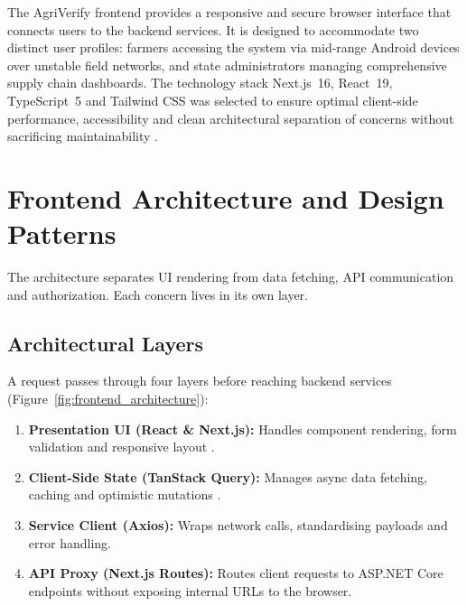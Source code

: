 
The AgriVerify frontend provides a responsive and secure browser interface that connects users to the backend services. It is designed to accommodate two distinct user profiles: farmers accessing the system via mid-range Android devices over unstable field networks, and state administrators managing comprehensive supply chain dashboards. The technology stack Next.js~16, React~19, TypeScript~5 and Tailwind CSS was selected to ensure optimal client-side performance, accessibility and clean architectural separation of concerns without sacrificing maintainability \cite{salim2024microservices, singh2026impact}.

\section{Frontend Architecture and Design Patterns}
\label{sec:frontend-architecture}

The architecture separates UI rendering from data fetching, API communication and authorization. Each concern lives in its own layer.

\subsection{Architectural Layers}
A request passes through four layers before reaching backend services (Figure~\ref{fig:frontend_architecture}):
\begin{enumerate}
    \item \textbf{Presentation UI (React \& Next.js):} Handles component rendering, form validation and responsive layout \cite{react2024}.
    \item \textbf{Client-Side State (TanStack Query):} Manages async data fetching, caching and optimistic mutations \cite{tanstack2024}.
    \item \textbf{Service Client (Axios):} Wraps network calls, standardising payloads and error handling.
    \item \textbf{API Proxy (Next.js Routes):} Routes client requests to ASP.NET Core endpoints without exposing internal URLs to the browser.
\end{enumerate}

